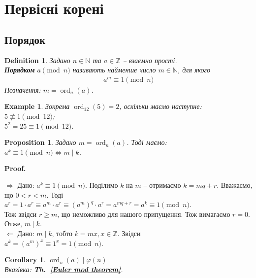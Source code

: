 \documentclass[a4paper, 14pt]{extarticle}
\makeatletter
\theoremstyle{theoremdd}
\theoremstyle{theoremdd}
\newtheorem{definition}[theorem]{Definition}
\theoremstyle{theoremdd}
\theoremstyle{theoremdd}
\newtheorem{example}[theorem]{Example}
\theoremstyle{theoremdd}
\newtheorem{proposition}[theorem]{Proposition}
\theoremstyle{theoremdd}
\theoremstyle{theoremdd}
\theoremstyle{theoremdd}
\newtheorem{corollary}[theorem]{Corollary}
\def\qed{$\blacksquare$}
\def\rightproof{$\boxed{\Rightarrow}$ }
\def\leftproof{$\boxed{\Leftarrow}$ }
\renewenvironment{proof}[1][Proof.\\]{\par
\pushQED{\hfill \qed}%
\normalfont \topsep6\p@\@plus6\p@\relax
\trivlist
\item\relax
{\bfseries
#1\@addpunct{.}}\hspace\labelsep\ignorespaces
}{%
\popQED\endtrivlist\@endpefalse
}
\DeclareMathOperator{\ord}{ord}
\newcommand\thref[1]{\textbf{Th.~\ref{#1}}}
\makeatother
\begin{document}
\section{Первісні корені}

\subsection{Порядок}
\begin{definition}
Задано $n \in \mathbb{N}$ та $a \in \mathbb{Z}$ -- взаємно прості.\\
\textbf{Порядком} $a \pmod n$ називають найменше число $m \in \mathbb{N}$, для якого
\begin{align*}
a^m \equiv 1 \pmod n
\end{align*}
Позначення: $m = \ord_n(a)$.
\end{definition}

\begin{example}
Зокрема $\ord_{12}(5) = 2$, оскільки маємо наступне:\\
$5 \not \equiv 1 \pmod {12}$;\\
$5^2 = 25 \equiv 1 \pmod {12}$.
\end{example}

\begin{proposition}
Задано $m = \ord_n(a)$. Тоді маємо:\\
$a^k \equiv 1 \pmod n \iff m \mid k$.
\end{proposition}

\begin{proof}
\rightproof Дано: $a^k \equiv 1 \pmod n$. Поділимо $k$ на $m$ -- отримаємо $k = mq +r$. Вважаємо, що $0 < r < m$. Тоді\\
$a^r = 1 \cdot a^r \equiv a^m \cdot a^r \equiv (a^m)^q \cdot a^r = a^{mq+r} = a^k \equiv 1 \pmod n$.\\
Тож звідси $r \geq m$, що неможливо для нашого припущення. Тож вимагаємо $r = 0$. Отже, $m \mid k$.
\bigskip \\
\leftproof Дано: $m \mid k$, тобто $k = mx, x \in \mathbb{Z}$. Звідси\\
$a^k = (a^m)^x \equiv 1^x = 1 \pmod n$.
\end{proof}

\begin{corollary}
$\ord_n(a) \mid \varphi(n)$\\
\textit{Вказівка:} \thref{Euler mod theorem}.
\end{corollary}

\iffalse
\begin{example}
Доведемо, що прості множники чисел Ферма $F_n = 2^{2^n} + 1$ мають форму $x 2^{n+1} +1$ для деякого $x \in \mathbb{N}$.\\
Нехай $p|F_n$, тобто $F_n \equiv 0 \pmod p$, що теж саме, що $2^{2^n} \equiv -1 \pmod p$.\\
Звідси $(2^{2^n})^2 = 2^{2^{n+1}} \equiv 1 \pmod p$. Отже, за твердженням, $\ord_p(2) | 2^{n+1}$. Доведемо, що $\ord_p 2 = 2^{n+1}$.\\
!Припустимо, що $\ord_p 2 \neq 2^{n+1}$. Тоді звідси $\ord_p 2 | 2^n$.
\end{example}
\fi
\end{document}
